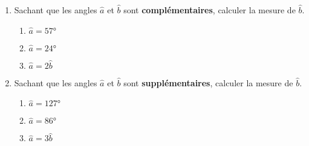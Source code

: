 \begin{exercice*}
    \begin{enumerate}
        \item Sachant que les angles $\hat{a}$ et $\hat{b}$ sont \textbf{complémentaires}, calculer la mesure de $\hat{b}$.
        \begin{enumerate}
            \item $\hat{a}=\ang{57}$
            \item $\hat{a}=\ang{24}$
            \item $\hat{a}=2\hat{b}$
        \end{enumerate}
        \item Sachant que les angles $\hat{a}$ et $\hat{b}$ sont \textbf{supplémentaires}, calculer la mesure de $\hat{b}$.
        \begin{enumerate}
            \item $\hat{a}=\ang{127}$
            \item $\hat{a}=\ang{86}$
            \item $\hat{a}=3\hat{b}$
        \end{enumerate}
    \end{enumerate}
\end{exercice*}

